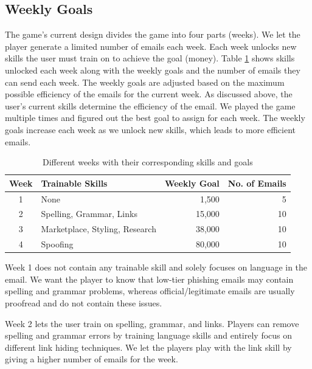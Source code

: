 \subsection{Weekly Goals}
The game's current design divides the game into four parts (weeks). We let the player generate a limited number of emails each week. Each week unlocks new skills the user must train on to achieve the goal (money). Table \ref{tab:weekly-goals} shows skills unlocked each week along with the weekly goals and the number of emails they can send each week. The weekly goals are adjusted based on the maximum possible efficiency of the emails for the current week. As discussed above, the user's current skills determine the efficiency of the email. We played the game multiple times and figured out the best goal to assign for each week. The weekly goals increase each week as we unlock new skills, which leads to more efficient emails.

\begin{table}[ht]
    \centering
    \begin{tabular}{c l r r}
        \hline

        \textbf{Week} & \textbf{Trainable Skills}      & \textbf{Weekly Goal} & \textbf{No. of Emails} \\
        \hline
        1             & None                           & 1,500                & 5                      \\
        2             & Spelling, Grammar, Links       & 15,000               & 10                     \\
        3             & Marketplace, Styling, Research & 38,000               & 10                     \\
        4             & Spoofing                       & 80,000               & 10                     \\
        \hline
    \end{tabular}%
    \caption{Different weeks with their corresponding skills and goals}
    \label{tab:weekly-goals}
\end{table}

Week 1 does not contain any trainable skill and solely focuses on language in the email. We want the player to know that low-tier phishing emails may contain spelling and grammar problems, whereas official/legitimate emails are usually proofread and do not contain these issues.

Week 2 lets the user train on spelling, grammar, and links. Players can remove spelling and grammar errors by training language skills and entirely focus on different link hiding techniques. We let the players play with the link skill by giving a higher number of emails for the week.

